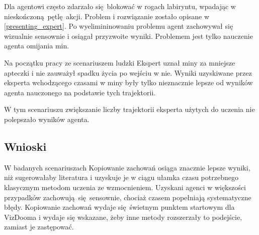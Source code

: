 Dla  agentowi często zdarzało się blokować w rogach labiryntu, wpadając w nieskończoną pętlę akcji. Problem i rozwiązanie zostało opisane w \ref{presenting_expert}. Po wyelimininowaniu problemu agent zachowywał się wizualnie sensownie i osiągał przyzwoite wyniki. Problemem jest tylko nauczenie agenta omijania min.

Na początku pracy ze scenariuszem ludzki Ekspert uznał miny za mniejsze apteczki i nie zauważył spadku życia po wejściu w nie. Wyniki uzyskiwane przez eksperta wchodzącego czasami w miny były tylko nieznacznie lepsze od wyników agenta nauczonego na podstawie tych trajektorii.

W tym scenariuszu zwiększanie liczby trajektorii eksperta użytych do uczenia nie polepszało wyników agenta. 

\subsection{Wnioski}
W badanych scenariuszach Kopiowanie zachowań osiąga znacznie lepsze wyniki, niż sugerowałaby literatura i uzyskuje je w ciągu ułamka czasu potrzebnego klasycznym metodom uczenia ze wzmocnieniem. Uzyskani agenci w większości przypadków zachowują się sensownie, chociaż czasem popełniają systematyczne błędy. Kopiowanie zachowań wydaje się świetnym punktem startowym dla VizDooma i wydaje się wskazane, żeby inne metody rozszerzały to podejście, zamiast je zastępować.
